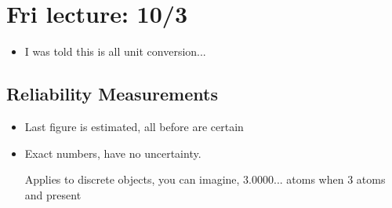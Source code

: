 \documentclass{article}
\begin{document}
\section{Fri lecture: 10/3}
\begin{itemize}
  \item I was told this is all unit conversion...
\end{itemize}

\subsection{Reliability Measurements}
\begin{itemize}
  \item Last figure is estimated, all before are certain
  \item Exact numbers, have no uncertainty.

    Applies to discrete objects, you can imagine, 3.0000... atoms when 3 atoms and present
\end{itemize}
\end{document}
